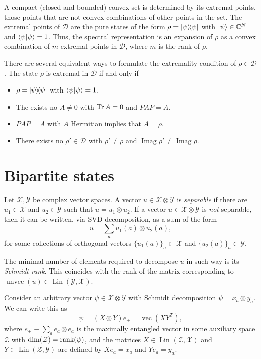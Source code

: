 \documentclass[12pt]{report}
\newcommand{\on}[1]{\operatorname{#1}}
\newcommand{\calY}{{\mathcal{Y}}}
\newcommand{\calX}{{\mathcal{X}}}
\newcommand{\calZ}{{\mathcal{Z}}}
\DeclareMathOperator{\Imag}{Imag}
\DeclareMathOperator{\Lin}{Lin}
\begin{document}
A compact (closed and bounded) convex set is determined by its extremal points,
those points that are not convex combinations of other points in the set.
The extremal points of $\mathcal D$ are the pure states of the form
$\rho=\ketbra\psi$ with $\ket\psi\in\mathbb C^N$ and $\braket\psi=1$.
Thus, the spectral representation is an expansion of $\rho$ as a convex combination of $m$ extremal points in $\mathcal D$, where $m$ is the rank of $\rho$.

There are several equivalent ways to formulate the extremality condition of $\rho \in\mathcal D$.
The state $\rho$ is extremal in $\mathcal D$ if and only if
\begin{itemize}
	\item $\rho = \ketbra\psi$ with $\braket\psi=1$.
	\item The exists no $A\neq 0$ with $\Tr A=0$ and $PAP=A$.
	\item $PAP=A$ with $A$ Hermitian implies that $A=\rho$.
	\item There exists no $\rho'\in\mathcal D$ with $\rho'\neq\rho$ and $\Imag\rho'\neq\Imag\rho$.
\end{itemize}

\section{Bipartite states}

\begin{defn}
	Let $\calX,\calY$ be complex vector spaces.
	A vector $u\in\calX\otimes\calY$ is \emph{separable} if there are $u_1\in\calX$ and $u_2\in\calY$ such that $u=u_1\otimes u_2$.
	If a vector $u\in\calX\otimes \calY$ is \emph{not} separable, then it can be written, via SVD decomposition, as a sum of the form
	\begin{equation}
		u = \sum_a u_1(a) \otimes u_2(a),
	\end{equation}
	for some collections of orthogonal vectors $\{u_1(a)\}_a\subset\calX$ and $\{u_2(a)\}_a\subset\calY$.

	The minimal number of elements required to decompose $u$ in such way is its \emph{Schmidt rank}.
	This coincides with the rank of the matrix corresponding to $\on{unvec}(u)\in\Lin(\calY,\calX)$.
\end{defn}

Consider an arbitrary vector $\psi\in\calX\otimes\calY$ with Schmidt decomposition
$\psi=x_a\otimes y_a$. We can write this as
\begin{equation}
	\psi = (X\otimes Y) e_+ = \on{vec}(XY^T),
\end{equation}
where $e_+\equiv\sum_a e_a\otimes e_a$ is the maximally entangled vector in some auxiliary space $\calZ$ with $\dim(\calZ)=\rank(\psi)$, and the matrices $X\in\Lin(\calZ,\calX)$ and $Y\in\Lin(\calZ,\calY)$ are defined by
$X e_a=x_a$ and $Y e_a=y_a$.
\end{document}
